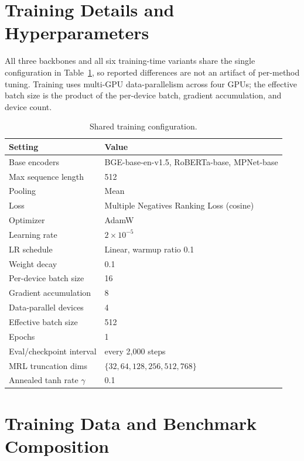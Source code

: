 \appendix

\section{Training Details and Hyperparameters}
\label{app:hyperparams}
All three backbones and all six training-time variants share the single
configuration in Table~\ref{tab:hyperparams}, so reported differences are not an
artifact of per-method tuning. Training uses multi-GPU data-parallelism across
four GPUs; the effective batch size is the product of the per-device batch,
gradient accumulation, and device count.

\begin{table}[h]
  \centering
  \caption{Shared training configuration.}
  \label{tab:hyperparams}
  \begin{tabular}{ll}
    \toprule
    \textbf{Setting} & \textbf{Value} \\
    \midrule
    Base encoders & BGE-base-en-v1.5, RoBERTa-base, MPNet-base \\
    Max sequence length & 512 \\
    Pooling & Mean \\
    Loss & Multiple Negatives Ranking Loss (cosine) \\
    Optimizer & AdamW \\
    Learning rate & $2\times10^{-5}$ \\
    LR schedule & Linear, warmup ratio 0.1 \\
    Weight decay & 0.1 \\
    Per-device batch size & 16 \\
    Gradient accumulation & 8 \\
    Data-parallel devices & 4 \\
    Effective batch size & 512 \\
    Epochs & 1 \\ %
    Eval/checkpoint interval & every 2{,}000 steps \\
    MRL truncation dims & $\{32, 64, 128, 256, 512, 768\}$ \\
    Annealed tanh rate $\gamma$ & 0.1 \\
    \bottomrule
  \end{tabular}
\end{table}

\section{Training Data and Benchmark Composition}
\label{app:data}

